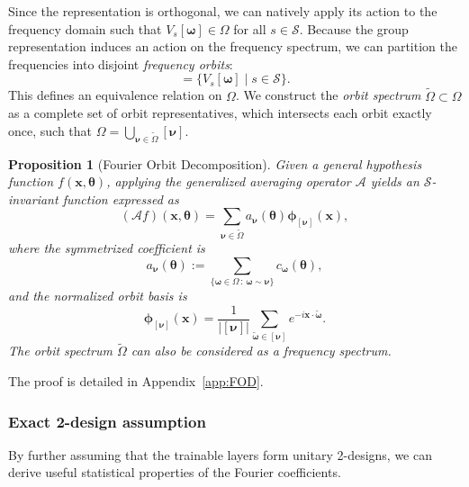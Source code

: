 \documentclass[%
 reprint,
 amsmath,amssymb,
 aps,
 pra,
]{revtex4-2}
\newtheorem{proposition}[theorem]{Proposition}
\theoremstyle{definition}
\begin{document}
Since the representation is orthogonal, we can natively apply its action to the frequency domain such that \(V_s[\bm{\omega}] \in \Omega\) for all \(s \in \mathcal{S}\). Because the group representation induces an action on the frequency spectrum, we can partition the frequencies into disjoint \textit{frequency orbits}:
\begin{equation}
[\bm{\omega}] = \{ V_s[\bm{\omega}] \mid s \in \mathcal{S} \}.
\end{equation}
This defines an equivalence relation on \(\Omega\). We construct the \textit{orbit spectrum} \(\tilde{\Omega} \subset \Omega\) as a complete set of orbit representatives, which intersects each orbit exactly once, such that \(\Omega = \bigcup_{\bm{\nu} \in \tilde{\Omega}} [\bm{\nu}]\).

\begin{proposition}[Fourier Orbit Decomposition]
\label{prop:FOD}
Given a general hypothesis function \(f(\bm{x}, \bm{\theta})\), applying the generalized averaging operator \(\mathcal{A}\) yields an \(\mathcal{S}\)-invariant function expressed as
\begin{equation}
\label{eq:FOD}
(\mathcal{A}f)(\bm{x}, \bm{\theta}) = \sum_{\bm{\nu} \in \tilde{\Omega}} a_{\bm{\nu}}(\bm{\theta}) \bm{\phi}_{[\bm{\nu}]}(\bm{x}),
\end{equation}
where the symmetrized coefficient is
\begin{equation}
a_{\bm{\nu}}(\bm{\theta}) := \sum_{\{\bm{\omega} \in \Omega \,:\, \bm{\omega} \sim \bm{\nu}\}} c_{\bm{\omega}}(\bm{\theta}),
\end{equation}
and the normalized orbit basis is
\begin{equation}
\bm{\phi}_{[\bm{\nu}]}(\bm{x}) = \frac{1}{|[\bm{\nu}]|} \sum_{\tilde{\bm{\omega}} \in [\bm{\nu}]} e^{-i \bm{x} \cdot \tilde{\bm{\omega}}}.
\end{equation}
The orbit spectrum \(\tilde{\Omega}\) can also be considered as a frequency spectrum.
\end{proposition}

The proof is detailed in Appendix~\ref{app:FOD}. 

\subsubsection{Exact 2-design assumption}

By further assuming that the trainable layers form unitary 2-designs, we can derive useful statistical properties of the Fourier coefficients.
\end{document}
